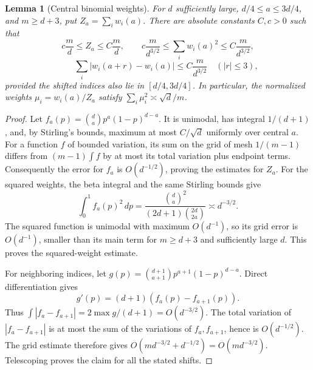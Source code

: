 \documentclass[11pt]{article}
\newtheorem{lemma}[theorem]{Lemma}
\begin{document}
\begin{lemma}[Central binomial weights]\label{weights}
For $d$ sufficiently large, $d/4\le a\le3d/4$, and $m\ge d+3$, put
$Z_a=\sum_iw_i(a)$. There are absolute constants $C,c>0$ such that
\[
 c\frac md\le Z_a\le C\frac md,
 \qquad c\frac m{d^{3/2}}\le\sum_iw_i(a)^2
                           \le C\frac m{d^{3/2}},
\]
\[
 \qquad
 \sum_i|w_i(a+r)-w_i(a)|\le C\frac m{d^{3/2}}
 \quad (|r|\le3),
\]
provided the shifted indices also lie in $[d/4,3d/4]$. In particular,
the normalized weights $\mu_i=w_i(a)/Z_a$ satisfy
$\sum_i\mu_i^2\asymp\sqrt d/m$.
\end{lemma}
\begin{proof}
Let $f_a(p)=\binom da p^a(1-p)^{d-a}$. It is unimodal, has integral
$1/(d+1)$, and, by Stirling's bounds, maximum at most $C/\sqrt d$
uniformly over central $a$. For a function $f$ of bounded variation,
its sum on the grid of mesh $1/(m-1)$ differs from $(m-1)\int f$ by
at most its total variation plus endpoint terms. Consequently the
error for $f_a$ is $O(d^{-1/2})$, proving the estimates for $Z_a$.
For the squared weights, the beta integral and the same Stirling bounds
give
\[
 \int_0^1 f_a(p)^2\,dp
 =\frac{\binom da^2}{(2d+1)\binom{2d}{2a}}
 \asymp d^{-3/2}.
\]
The squared function is unimodal with maximum $O(d^{-1})$, so its
grid error is $O(d^{-1})$, smaller than its main term for $m\ge d+3$
and sufficiently large $d$. This proves the squared-weight estimate.

For neighboring indices, let
$g(p)=\binom{d+1}{a+1}p^{a+1}(1-p)^{d-a}$. Direct differentiation gives
\[
 g'(p)=(d+1)(f_a(p)-f_{a+1}(p)).
\]
Thus $\int|f_a-f_{a+1}|=2\max g/(d+1)=O(d^{-3/2})$.
The total variation of $|f_a-f_{a+1}|$ is at most the sum of the
variations of $f_a,f_{a+1}$, hence is $O(d^{-1/2})$. The grid estimate
therefore gives $O(md^{-3/2}+d^{-1/2})=O(md^{-3/2})$.
Telescoping proves the claim for all the stated shifts.
\end{proof}
\end{document}
